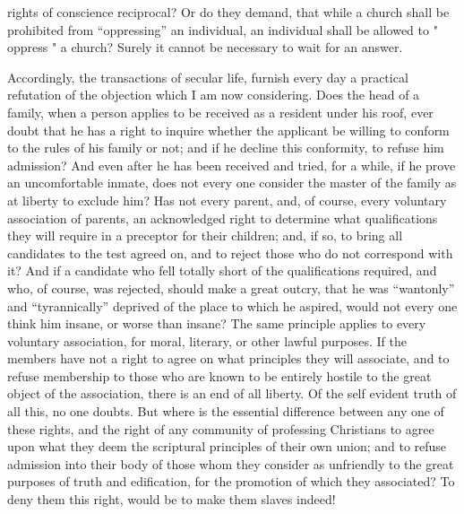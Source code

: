 \documentclass[
]{book}
\begin{document}
rights of conscience reciprocal? Or do they demand, that while a church shall be prohibited from ``oppressing'' an individual, an individual shall be allowed to " oppress " a church? Surely it cannot be necessary to wait for an answer.

Accordingly, the transactions of secular life, furnish every day a practical refutation of the objection which I am now considering. Does the head of a family, when a person applies to be received as a resident under his roof, ever doubt that he has a right to inquire whether the applicant be willing to conform to the rules of his family or not; and if he decline this conformity, to refuse him admission? And even after he has been received and tried, for a while, if he prove an uncomfortable inmate, does not every one consider the master of the family as at liberty to exclude him? Has not every parent, and, of course, every voluntary association of parents, an acknowledged right to determine what qualifications they will require in a preceptor for their children; and, if so, to bring all candidates to the test agreed on, and to reject those who do not correspond with it? And if a candidate who fell totally short of the qualifications required, and who, of course, was rejected, should make a great outcry, that he was ``wantonly'' and ``tyrannically'' deprived of the place to which he aspired, would not every one think him insane, or worse than insane? The same principle applies to every voluntary association, for moral, literary, or other lawful purposes. If the members have not a right to agree on what principles they will associate, and to refuse membership to those who are known to be entirely hostile to the great object of the association, there is an end of all liberty. Of the self evident truth of all this, no one doubts. But where is the essential difference between any one of these rights, and the right of any community of professing Christians to agree upon what they deem the scriptural principles of their own union; and to refuse admission into their body of those whom they consider as unfriendly to the great purposes of truth and edification, for the promotion of which they associated? To deny them this right, would be to make them slaves indeed!
\end{document}
